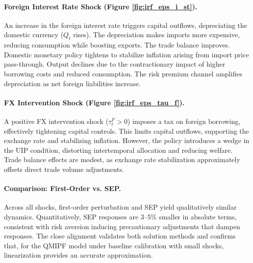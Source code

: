 \documentclass[12pt]{article}
\begin{document}
\paragraph{Foreign Interest Rate Shock (Figure \ref{fig:irf_eps_i_st}).}
An increase in the foreign interest rate triggers capital outflows, depreciating the domestic currency ($Q_t$ rises). The depreciation makes imports more expensive, reducing consumption while boosting exports. The trade balance improves. Domestic monetary policy tightens to stabilize inflation arising from import price pass-through. Output declines due to the contractionary impact of higher borrowing costs and reduced consumption. The risk premium channel amplifies depreciation as net foreign liabilities increase.

\paragraph{FX Intervention Shock (Figure \ref{fig:irf_eps_tau_f}).}
A positive FX intervention shock ($\tau_t^F > 0$) imposes a tax on foreign borrowing, effectively tightening capital controls. This limits capital outflows, supporting the exchange rate and stabilizing inflation. However, the policy introduces a wedge in the UIP condition, distorting intertemporal allocation and reducing welfare. Trade balance effects are modest, as exchange rate stabilization approximately offsets direct trade volume adjustments.

\paragraph{Comparison: First-Order vs. SEP.}
Across all shocks, first-order perturbation and SEP yield qualitatively similar dynamics. Quantitatively, SEP responses are 3--5\% smaller in absolute terms, consistent with risk aversion inducing precautionary adjustments that dampen responses. The close alignment validates both solution methods and confirms that, for the QMIPF model under baseline calibration with small shocks, linearization provides an accurate approximation.
\end{document}
